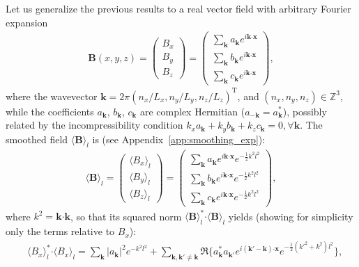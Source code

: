 \documentclass[]{article}
\newcommand{\bcdot}{\bm{\cdot}}
\begin{document}
Let us generalize the previous results to a real vector field with arbitrary Fourier expansion
%
\begin{align}
	\bm B (x,y,z) = \begin{pmatrix}
		B_x \\ B_y \\ B_z
	\end{pmatrix} = \begin{pmatrix}
		\sum_{\bm k} a_{\bm k} e^{i \bm k \bcdot\bm x }  \\ \sum_{\bm k} b_{\bm k} e^{i \bm k \bcdot\bm x } \\ \sum_{\bm k} c_{\bm k} e^{i \bm k \bcdot\bm x }
	\end{pmatrix},
\end{align}
%
where the wavevector $\bm k = 2 \pi \left(n_x/L_x, n_y/L_y, n_z/L_z \right)^\mathrm{T}$, and $\left(n_x, n_y, n_z \right) \in \mathbb{Z}^3$, while the coefficients $a_{\bm k}$, $b_{\bm k}$, $c_{\bm k}$ are complex Hermitian ($a_{-\bm k} = a_{\bm k}^*$), possibly related by the incompressibility condition $k_x a_{\bm k} + k_y b_{\bm k} + k_z c_{\bm k} = 0, \forall \bm k$. 
The smoothed field $\langle \bm B \rangle_l$ is (see Appendix~\ref{app:smoothing_exp}):
%
\begin{align}
	\langle \bm B \rangle_l = \begin{pmatrix}
		\langle B_x \rangle_l \\ \langle B_y \rangle_l \\ \langle B_z \rangle_l
	\end{pmatrix} = \begin{pmatrix}
		\sum_{\bm k} a_{\bm k} e^{i \bm k \bcdot\bm x } e^{-\frac{1}{2} k^2 l^2}   \\ \sum_{\bm k} b_{\bm k} e^{i \bm k \bcdot\bm x } e^{-\frac{1}{2} k^2 l^2}  \\ \sum_{\bm k} c_{\bm k} e^{i \bm k \bcdot\bm x } e^{-\frac{1}{2} k^2 l^2} 
	\end{pmatrix},
\end{align}
%
where $k^2 = \bm k \bcdot\bm k$, so that its squared norm $\langle \bm B \rangle_l^* \bcdot\langle \bm B \rangle_l$ yields (showing for simplicity only the terms relative to $B_x$):
%
\begin{align}
	&\langle B_x \rangle_l^* \bcdot\langle B_x \rangle_l  = \sum_{\bm k} |a_{\bm k}|^2 e^{- k^2 l^2} +  \sum_{\bm k, \bm k' \neq \bm k} \Re \lbrace a_{\bm k}^* a_{\bm k'} e^{i (\bm k' - \bm k) \bcdot\bm x } e^{-\frac{1}{2} (k'^2 + k^2) l^2} \rbrace,
\end{align}
\end{document}
